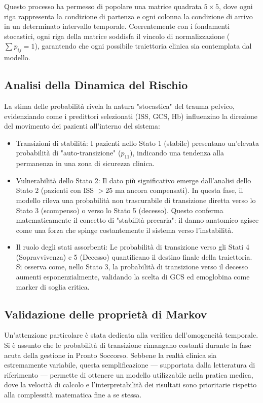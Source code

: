 \documentclass[11pt, oneside, noexaminfo]{sapthesis}   	%
\begin{document}
Questo processo ha permesso di popolare una matrice quadrata $5 \times 5$, dove ogni riga rappresenta la condizione di partenza e ogni colonna la condizione di arrivo in un determinato intervallo temporale. Coerentemente con i fondamenti stocastici, ogni riga della matrice soddisfa il vincolo di normalizzazione ($\sum p_{ij} = 1$), garantendo che ogni possibile traiettoria clinica sia contemplata dal modello.

\subsection{Analisi della Dinamica del Rischio}
La stima delle probabilità rivela la natura "stocastica" del trauma pelvico, evidenziando come i predittori selezionati (ISS, GCS, Hb) influenzino la direzione del movimento dei pazienti all'interno del sistema:

\begin{itemize}
\item {Transizioni di stabilità}: I pazienti nello Stato 1 (stabile) presentano un'elevata probabilità di "auto-transizione" ($p_{11}$), indicando una tendenza alla permanenza in una zona di sicurezza clinica.
\item {Vulnerabilità dello Stato 2}: Il dato più significativo emerge dall'analisi dello Stato 2 (pazienti con ISS $> 25$ ma ancora compensati). In questa fase, il modello rileva una probabilità non trascurabile di transizione diretta verso lo Stato 3 (scompenso) o verso lo Stato 5 (decesso). Questo conferma matematicamente il concetto di "stabilità precaria": il danno anatomico agisce come una forza che spinge costantemente il sistema verso l'instabilità.
\item {Il ruolo degli stati assorbenti}: Le probabilità di transizione verso gli Stati 4 (Sopravvivenza) e 5 (Decesso) quantificano il destino finale della traiettoria. Si osserva come, nello Stato 3, la probabilità di transizione verso il decesso aumenti esponenzialmente, validando la scelta di GCS ed emoglobina come marker di soglia critica.
\end{itemize}

\subsection{Validazione delle proprietà di Markov}
Un'attenzione particolare è stata dedicata alla verifica dell'omogeneità temporale. Si è assunto che le probabilità di transizione rimangano costanti durante la fase acuta della gestione in Pronto Soccorso. Sebbene la realtà clinica sia estremamente variabile, questa semplificazione — supportata dalla letteratura di riferimento — permette di ottenere un modello utilizzabile nella pratica medica, dove la velocità di calcolo e l'interpretabilità dei risultati sono prioritarie rispetto alla complessità matematica fine a se stessa.
\end{document}
